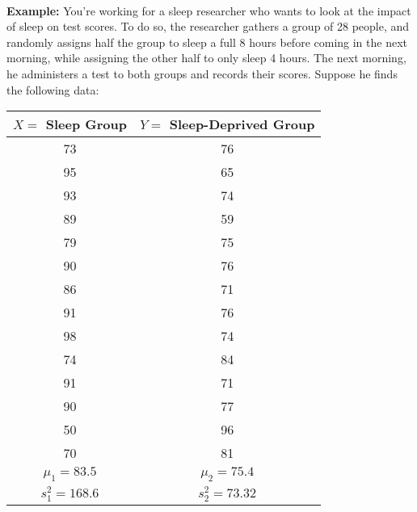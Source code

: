 ~



\textbf{Example:}  You're \ex working for a sleep researcher who wants to look at the impact of sleep on test scores. To do so, the researcher gathers a group of 28 people, and randomly assigns half the group to sleep a full 8 hours before coming in the next morning, while assigning the other half to only sleep 4 hours. The next morning, he administers a test to both groups and records their scores. Suppose he finds the following data:



\begin{center}

\begin{tabular}{|c|c|}

\hline

$X=$ Sleep Group & $Y=$ Sleep-Deprived Group\tabularnewline

\hline

\hline

73 & 76\tabularnewline

\hline

95 & 65\tabularnewline

\hline

93 & 74\tabularnewline

\hline

89 & 59\tabularnewline

\hline

79 & 75\tabularnewline

\hline

90 & 76\tabularnewline

\hline

86 & 71\tabularnewline

\hline

91 & 76\tabularnewline

\hline

98 & 74\tabularnewline

\hline

74 & 84\tabularnewline

\hline

91 & 71\tabularnewline

\hline

90 & 77\tabularnewline

\hline

50 & 96\tabularnewline

\hline

70 & 81\tabularnewline

\hline

$\mu_{1}=83.5$ & $\mu_{2}=75.4$\tabularnewline

\hline

$s_{1}^{2}=168.6$ & $s_{2}^{2}=73.32$\tabularnewline

\hline

\end{tabular}

\par\end{center}



